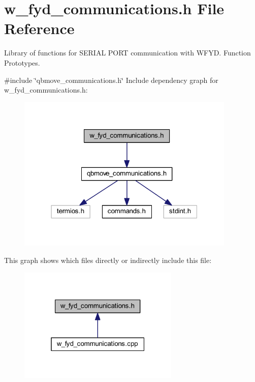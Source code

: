 \section{w\+\_\+fyd\+\_\+communications.\+h File Reference}
\label{w__fyd__communications_8h}


Library of functions for S\+E\+R\+I\+AL P\+O\+RT communication with W\+F\+YD. Function Prototypes.  


{\ttfamily \#include \char`\"{}qbmove\+\_\+communications.\+h\char`\"{}}\newline
Include dependency graph for w\+\_\+fyd\+\_\+communications.\+h\+:
\nopagebreak
\begin{figure}[H]
\begin{center}
\leavevmode
\includegraphics[width=295pt]{w__fyd__communications_8h__incl}
\end{center}
\end{figure}
This graph shows which files directly or indirectly include this file\+:
\nopagebreak
\begin{figure}[H]
\begin{center}
\leavevmode
\includegraphics[width=217pt]{w__fyd__communications_8h__dep__incl}
\end{center}
\end{figure}
